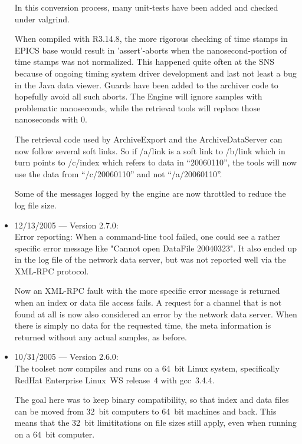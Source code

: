 \begin{itemize}
In this conversion process, many unit-tests have been added
and checked under valgrind.

When compiled with R3.14.8, the more rigorous checking of time stamps
in EPICS base would result in 'assert'-aborts when the
nanosecond-portion of time stamps was not normalized.
This happened quite often at the SNS because of ongoing timing system driver
development and last not least a bug in the Java data viewer.
Guards have been added to the archiver code to hopefully avoid all
such aborts.
The Engine will ignore samples with problematic nanoseconds,
while the retrieval tools will replace those nanoseconds with 0.

The retrieval code used by ArchiveExport and the ArchiveDataServer can
now follow several soft links. So if /a/link is a soft link to /b/link
which in turn points to /c/index which refers to data in
``20060110'', the tools will now use the data from 
``/c/20060110'' and not ``/a/20060110''.

Some of the messages logged by the engine are now throttled
to reduce the log file size.

\item 12/13/2005 --- Version 2.7.0:\\
Error reporting: When a command-line tool failed,
one could see a rather specific error message
like "Cannot open DataFile 20040323".
It also ended up in the log file of the network
data server, but was not reported well via
the XML-RPC protocol.

Now an XML-RPC fault with the more specific error
message is returned when an index or data file
access fails.
A request for a channel that is not found at all is now
also considered an error by the network data server.
When there is simply no data for the requested time,
the meta information is returned without any
actual samples, as before.

\item 10/31/2005 --- Version 2.6.0:\\
The toolset now compiles and runs on a 64~bit Linux system,
specifically RedHat Enterprise Linux~WS release~4
with gcc~3.4.4.

The goal here was to keep binary compatibility,
so that index and data files can be moved from
32~bit computers to 64~bit machines and back.
This means that the 32~bit limititations on
file sizes still apply, even when running
on a 64~bit computer.


\end{itemize}
